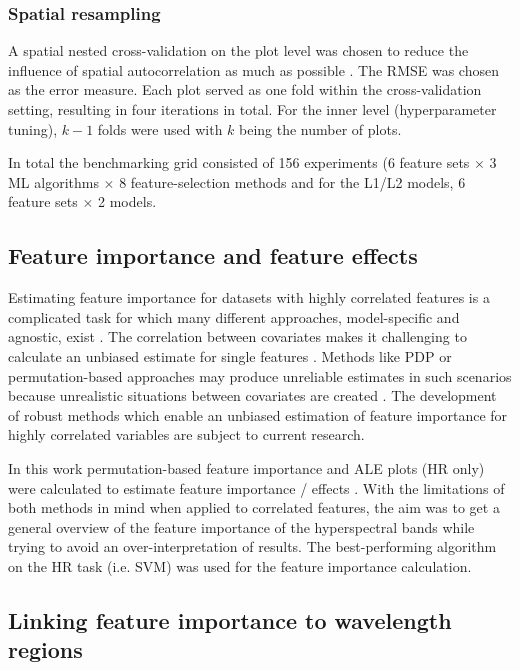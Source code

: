 \documentclass[letterpaper, peerreview, draftcls]{IEEEtran}
\begin{document}
\subsubsection{Spatial resampling}

A spatial nested cross-validation on the plot level was chosen to reduce the influence of spatial autocorrelation as much as possible \cite{schratz2019, sperrorest}.
The \ac{RMSE} was chosen as the error measure.
Each plot served as one fold within the cross-validation setting, resulting in four iterations in total.
For the inner level (hyperparameter tuning), \(k - 1\) folds were used with \(k\) being the number of plots.

In total the benchmarking grid consisted of 156 experiments (6 feature sets $\times$ 3 ML algorithms $\times$ 8 feature-selection methods and for the L1/L2 models, 6 feature sets $\times$ 2 models.

\subsection{Feature importance and feature effects}

Estimating feature importance for datasets with highly correlated features is a complicated task for which many different approaches, model-specific and agnostic, exist \cite{friedman2001, hastie2001, greenwell2018}.
The correlation between covariates makes it challenging to calculate an unbiased estimate for single features \cite{molnar2019}.
Methods like \ac{PDP} or permutation-based approaches may produce unreliable estimates in such scenarios because unrealistic situations between covariates are created \cite{molnar2019}.
The development of robust methods which enable an unbiased estimation of feature importance for highly correlated variables are subject to current research.

In this work permutation-based feature importance and \ac{ALE} plots (HR only) were calculated to estimate feature importance / effects \cite{apley2019, molnar2019}.
With the limitations of both methods in mind when applied to correlated features, the aim was to get a general overview of the feature importance of the hyperspectral bands while trying to avoid an over-interpretation of results.
The best-performing algorithm on the HR task (i.e. SVM) was used for the feature importance calculation.

\subsection{Linking feature importance to wavelength regions}
\end{document}
